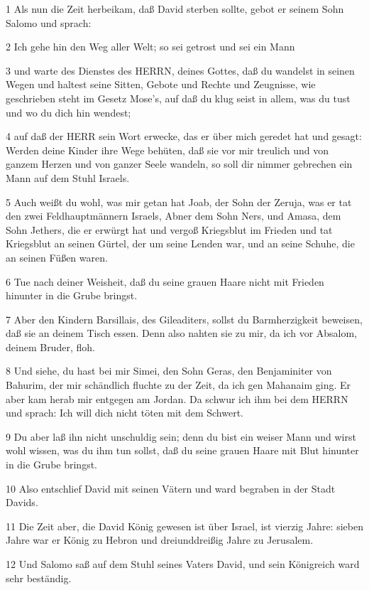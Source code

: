 \par 1 Als nun die Zeit herbeikam, daß David sterben sollte, gebot er seinem Sohn Salomo und sprach:
\par 2 Ich gehe hin den Weg aller Welt; so sei getrost und sei ein Mann
\par 3 und warte des Dienstes des HERRN, deines Gottes, daß du wandelst in seinen Wegen und haltest seine Sitten, Gebote und Rechte und Zeugnisse, wie geschrieben steht im Gesetz Mose's, auf daß du klug seist in allem, was du tust und wo du dich hin wendest;
\par 4 auf daß der HERR sein Wort erwecke, das er über mich geredet hat und gesagt: Werden deine Kinder ihre Wege behüten, daß sie vor mir treulich und von ganzem Herzen und von ganzer Seele wandeln, so soll dir nimmer gebrechen ein Mann auf dem Stuhl Israels.
\par 5 Auch weißt du wohl, was mir getan hat Joab, der Sohn der Zeruja, was er tat den zwei Feldhauptmännern Israels, Abner dem Sohn Ners, und Amasa, dem Sohn Jethers, die er erwürgt hat und vergoß Kriegsblut im Frieden und tat Kriegsblut an seinen Gürtel, der um seine Lenden war, und an seine Schuhe, die an seinen Füßen waren.
\par 6 Tue nach deiner Weisheit, daß du seine grauen Haare nicht mit Frieden hinunter in die Grube bringst.
\par 7 Aber den Kindern Barsillais, des Gileaditers, sollst du Barmherzigkeit beweisen, daß sie an deinem Tisch essen. Denn also nahten sie zu mir, da ich vor Absalom, deinem Bruder, floh.
\par 8 Und siehe, du hast bei mir Simei, den Sohn Geras, den Benjaminiter von Bahurim, der mir schändlich fluchte zu der Zeit, da ich gen Mahanaim ging. Er aber kam herab mir entgegen am Jordan. Da schwur ich ihm bei dem HERRN und sprach: Ich will dich nicht töten mit dem Schwert.
\par 9 Du aber laß ihn nicht unschuldig sein; denn du bist ein weiser Mann und wirst wohl wissen, was du ihm tun sollst, daß du seine grauen Haare mit Blut hinunter in die Grube bringst.
\par 10 Also entschlief David mit seinen Vätern und ward begraben in der Stadt Davids.
\par 11 Die Zeit aber, die David König gewesen ist über Israel, ist vierzig Jahre: sieben Jahre war er König zu Hebron und dreiunddreißig Jahre zu Jerusalem.
\par 12 Und Salomo saß auf dem Stuhl seines Vaters David, und sein Königreich ward sehr beständig.
